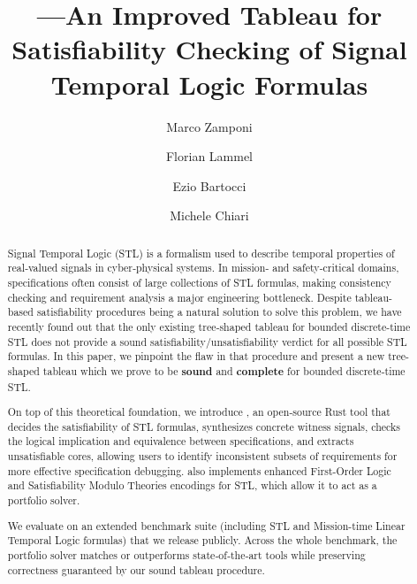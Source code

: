 \documentclass{easychair}
\begin{document}
\title{\stlsat{}---An Improved Tableau for Satisfiability Checking of Signal Temporal Logic Formulas}
\titlerunning{\stlsat{}}

\author{%
  Marco Zamponi  \and
  Florian Lammel \and
  Ezio Bartocci  \and
  Michele Chiari }



\maketitle

\begin{abstract}
    Signal Temporal Logic (STL) is a formalism used to describe temporal properties of real‑valued signals in cyber‑physical systems.
    In mission‑ and safety‑critical domains, specifications often consist of large collections of STL formulas, making consistency checking and requirement analysis a major engineering bottleneck. Despite tableau-based satisfiability procedures being a natural solution to solve this problem, we have recently found out that the only existing tree‐shaped tableau for bounded discrete-time STL does not provide a sound satisfiability/unsatisfiability verdict for all possible STL formulas.  In this paper, we pinpoint the flaw in that procedure and present a new tree-shaped tableau which we prove to be \textbf{sound} and \textbf{complete} for bounded discrete‑time STL.  
    
    On top of this theoretical foundation, we introduce \stlsat{}, an open‑source Rust tool that decides the satisfiability of STL formulas,  synthesizes concrete witness signals, checks the logical implication and equivalence between specifications, and extracts unsatisfiable cores, allowing users to identify inconsistent subsets of requirements for more effective specification debugging.  \stlsat{} also implements enhanced First-Order Logic and Satisfiability Modulo Theories encodings for STL, which allow it to act as a portfolio solver.

    We evaluate \stlsat{} on an extended benchmark suite (including STL and Mission-time Linear Temporal Logic formulas) that we release publicly.  Across the whole benchmark, the portfolio solver matches or outperforms state‑of‑the‑art tools while preserving correctness guaranteed by our sound tableau procedure.
\end{abstract}
\end{document}
